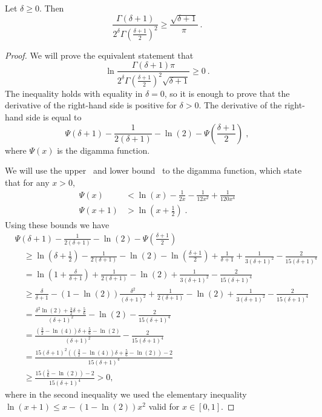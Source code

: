 \begin{lemma}
\label{lemma:ratio_gamma}
Let $\delta \geq 0$. Then
\[
\frac{\Gamma(\delta+1)}{2^\delta \Gamma(\frac{\delta+1}{2})^2}
\geq \frac{\sqrt{\delta+1}}{\pi}~.
\]
\end{lemma}
%
\begin{proof}
We will prove the equivalent statement that
\[
\ln \frac{\Gamma(\delta+1) \pi}{2^\delta \Gamma(\frac{\delta+1}{2})^2 \sqrt{\delta+1}} \geq 0~.
\]
The inequality holds with equality in $\delta=0$, so it is enough to prove that
the derivative of the right-hand side is positive for $\delta > 0$. The
derivative of the right-hand side is equal to
\[
\Psi(\delta+1) - \frac{1}{2(\delta+1)} -\ln(2) - \Psi\left(\frac{\delta+1}{2} \right) \; ,
\]
where $\Psi(x)$ is the digamma function.

We will use the upper~\citep{Chen05} and lower bound~\citep{Batir08}
to the digamma function, which state that for any $x>0$,
\begin{align*}
\Psi(x) &< \ln(x) -\frac{1}{2x} -\frac{1}{12 x^2} +\frac{1}{120 x^4} \\
\Psi(x+1) &> \ln \left(x+\frac{1}{2} \right) \; .
\end{align*}
Using these bounds we have
\begin{align*}
&\Psi(\delta+1) - \frac{1}{2(\delta+1)} - \ln(2) - \Psi \left(\frac{\delta+1}{2} \right) \\
&\quad \ge \ln \left(\delta+\frac{1}{2} \right) - \frac{1}{2(\delta+1)} -\ln(2) -\ln \left(\frac{\delta+1}{2}\right) + \frac{1}{\delta+1} +\frac{1}{3 (\delta+1)^2} -\frac{2}{15 (\delta+1)^4}\\
&\quad = \ln \left(1+\frac{\delta}{\delta+1} \right)+ \frac{1}{2(\delta+1)} -\ln(2)+\frac{1}{3 (\delta+1)^2} -\frac{2}{15 (\delta+1)^4}\\
&\quad \ge \frac{\delta}{\delta+1} - (1-\ln(2))\frac{\delta^2}{(\delta+1)^2}+ \frac{1}{2(\delta+1)} -\ln(2)+\frac{1}{3 (\delta+1)^2}-\frac{2}{15 (\delta+1)^4}\\
&\quad = \frac{\delta^2 \ln(2)+\frac{3}{2}\delta +\frac{5}{6}}{(\delta+1)^2} - \ln(2)-\frac{2}{15 (\delta+1)^4}\\
&\quad = \frac{(\frac{3}{2}-\ln(4)) \delta +\frac{5}{6}-\ln(2)}{(\delta+1)^2} -\frac{2}{15 (\delta+1)^4} \\
&\quad = \frac{15 (\delta+1)^2 \left((\frac{3}{2}-\ln(4)) \delta +\frac{5}{6}-\ln(2)\right)-2}{15(\delta+1)^4} \\
&\quad \geq \frac{15 \left(\frac{5}{6}-\ln(2)\right)-2}{15(\delta+1)^4} >0,
\end{align*}
where in the second inequality we used the elementary inequality $\ln(x+1) \leq x - (1-\ln(2))x^2$ valid for $x \in [0,1]$.
\end{proof}

